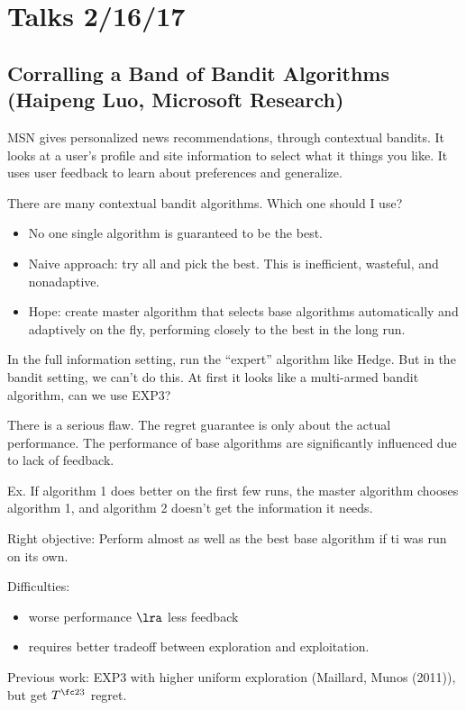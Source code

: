 \section{Talks 2/16/17}

\subsection{Corralling a Band of Bandit Algorithms (Haipeng Luo, Microsoft Research)}

MSN gives personalized news recommendations, through contextual bandits. It looks at a user's profile and site information to select what it things you like. It uses user feedback to learn about preferences and generalize.

There are many contextual bandit algorithms. Which one should I use?
\begin{itemize}
\item
No one single algorithm is guaranteed to be the best. 
\item
Naive approach: try all and pick the best. This is inefficient, wasteful, and nonadaptive.
\item
Hope: create master algorithm that selects base algorithms automatically and adaptively on the fly, performing closely to the best in the long run.
\end{itemize}

In the full information setting, run the ``expert'' algorithm like Hedge. But in the bandit setting, we can't do this. At first it looks like a multi-armed bandit algorithm, can we use EXP3?

There is a serious flaw. The regret guarantee is only about the actual performance. The performance of base algorithms are significantly influenced due to lack of feedback. 

Ex. If algorithm 1 does better on the first few runs, the master algorithm chooses algorithm 1, and algorithm 2 doesn't get the information it needs. 

Right objective: Perform almost as well as the best base algorithm if ti was run on its own.

Difficulties:
\begin{itemize}
\item
worse performance $\lra$ less feedback
\item
requires better tradeoff between  exploration and exploitation.
\end{itemize}

Previous work: EXP3 with higher uniform exploration (Maillard, Munos (2011)), but get $T^{\fc 23}$ regret.


